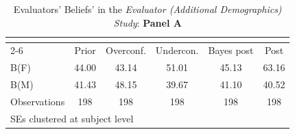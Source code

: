 \begin{table}[htbp]\centering
\caption{Evaluators' Beliefs' in the \textit{Evaluator (Additional Demographics) Study}: \textbf{Panel A}}
\begin{tabular}{l*{5}{c}}
\hline\hline
                &\multicolumn{5}{c}{}                             \\\cmidrule(lr){2-6}
                &\multicolumn{1}{c}{Prior}&\multicolumn{1}{c}{Overconf.}&\multicolumn{1}{c}{Undercon.}&\multicolumn{1}{c}{Bayes post}&\multicolumn{1}{c}{Post}\\
\hline
B(F)            &    44.00&    43.14&    51.01&    45.13&    63.16\\
B(M)            &    41.43&    48.15&    39.67&    41.10&    40.52\\
\hline
Observations    &      198&      198&      198&      198&      198\\
\hline\hline
\multicolumn{6}{l}{\footnotesize SEs clustered at subject level}\\
\end{tabular}
\end{table}
